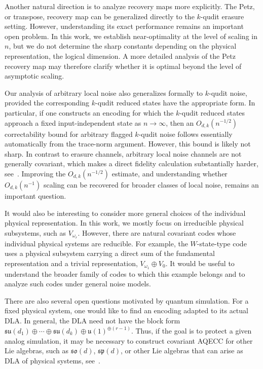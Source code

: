 \documentclass[10pt,twocolumn,superscriptaddress,aps,amsmath,amssymb,citeautoscript,floatfix,prx]{revtex4-2}
\newcounter{alg}
\theoremstyle{plain}
\theoremstyle{plain}
\theoremstyle{plain}
\theoremstyle{plain}
\theoremstyle{plain}
\theoremstyle{plain}
\theoremstyle{plain}
\theoremstyle{definition}
\theoremstyle{plain}
\begin{document}
Another natural direction is to analyze recovery maps more explicitly. The Petz, or transpose, recovery map can be generalized directly to the \(k\)-qudit erasure setting. 
However, understanding its exact performance remains an important open problem. In this work, we establish near-optimality at the level of scaling in \(n\), 
but we do not determine the sharp constants depending on the physical representation, the logical dimension. 
A more detailed analysis of the Petz recovery map may therefore clarify whether it is optimal beyond the level of asymptotic scaling.

Our analysis of arbitrary local noise also generalizes formally to \(k\)-qudit noise, provided the corresponding \(k\)-qudit reduced states have the appropriate form. 
In particular, if one constructs an encoding for which the \(k\)-qudit reduced states approach a fixed input-independent state as \(n\to\infty\), then an \(O_{d,k}(n^{-1/2})\) 
correctability bound for arbitrary flagged \(k\)-qudit noise follows essentially automatically from the trace-norm argument. However, this bound is likely not sharp. 
In contrast to erasure channels, arbitrary local noise channels are not generally covariant, which makes a direct fidelity calculation substantially harder, 
see~\cite{Alexander2025, Zhou2021}. Improving the \(O_{d,k}(n^{-1/2})\) estimate, and understanding whether \(O_{d,k}(n^{-1})\) scaling can be recovered for broader classes of local noise, 
remains an important question.

It would also be interesting to consider more general choices of the individual physical representation. 
In this work, we mostly focus on irreducible physical subsystems, such as \(V_{\omega_r}\). 
However, there are natural covariant codes whose individual physical systems are reducible. 
For example, the \(W\)-state-type code~\cite{Faist2020, Alexander2025} uses a physical subsystem carrying a direct sum of the fundamental representation 
and a trivial representation,
$
    V_{\omega_1}\oplus V_0.
$
It would be useful to understand the broader family of codes to which this example belongs and to analyze such codes under general noise models.

There are also several open questions motivated by quantum simulation. For a fixed physical system, one would like to find an encoding adapted to its actual DLA. 
In general, the DLA need not have the block form
$
    \mathfrak{su}(d_1)\oplus\cdots\oplus\mathfrak{su}(d_k)
    \oplus
    \mathfrak{u}(1)^{\oplus(r-1)}.
$
Thus, if the goal is to protect a given analog simulation, it may be necessary to construct covariant AQECC for other Lie algebras, 
such as \(\mathfrak{so}(d)\), \(\mathfrak{sp}(d)\), or other Lie algebras that can arise as DLA of physical systems, see~\cite{Kokcu2024, Wiersema2024}.
\end{document}
